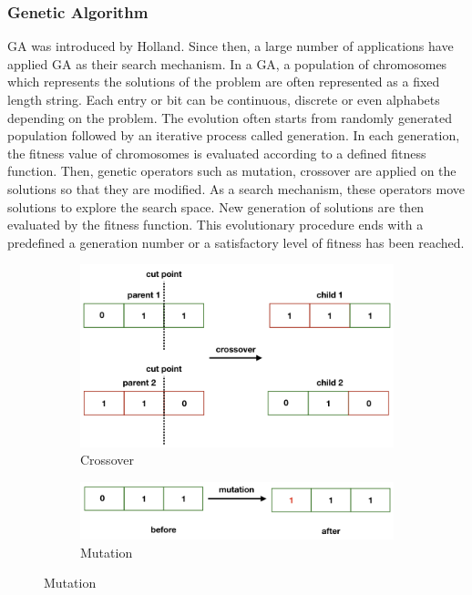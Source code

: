 \subsubsection{Genetic Algorithm}
GA \cite{Holland:1962fy} was introduced by Holland. Since then, a large number of applications \cite{DeJong:1992vk, DeJong:1992ws} have applied GA  as their search mechanism. In a GA, a population of chromosomes which represents the solutions of the problem are often represented as a fixed length string. Each entry or bit can be continuous, discrete or even alphabets depending on the problem.  The evolution often starts from randomly generated population followed by an iterative process called generation.  In each generation, the fitness value of chromosomes is evaluated according to a defined fitness function.  Then, genetic operators such as mutation, crossover are applied on the solutions so that they are modified. As a search mechanism, these operators move solutions to explore the search space. New generation of solutions are then evaluated by the fitness function.  This evolutionary procedure ends with a predefined a generation number or a satisfactory level of fitness has been reached.

\begin{figure}
	\centering
	\begin{subfigure}[b]{0.44\textwidth}
		\includegraphics[width=\textwidth]{pics/crossover.png}
	\caption{Crossover}
	\end{subfigure}
	\begin{subfigure}[b]{0.44\textwidth}
		\includegraphics[width=\textwidth]{pics/mutation.png}
	\caption{Mutation}
	\end{subfigure}
	\label{fig:operators}
\end{figure}

